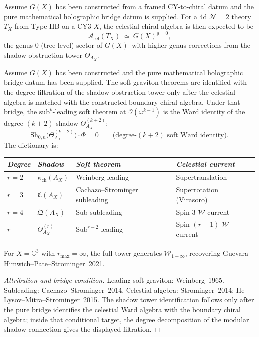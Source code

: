 \begin{conjecture}
\label{conj:phys-cy3-celestial}
\ClaimStatusConjectured
Assume $G(X)$ has been constructed from a framed CY-to-chiral datum and
the pure mathematical holographic bridge datum is supplied. For a 4d
$\mathcal{N}=2$ theory $T_X$ from Type IIB on a CY3 $X$, the celestial
chiral algebra is then expected to be
\[
\mathcal{A}_{\mathrm{cel}}(T_X) \;\simeq\; G(X)^{g=0},
\]
the genus-0 (tree-level) sector of $G(X)$, with higher-genus corrections from the shadow obstruction tower $\Theta_{A_X}$.
\end{conjecture}

\begin{proposition}
\label{prop:phys-cel-soft-shadow}
Assume \(G(X)\) has been constructed and the pure mathematical
holographic bridge datum has been supplied.
The soft graviton theorems are identified with the degree filtration of the shadow obstruction tower only after the celestial algebra is matched with the constructed boundary chiral algebra. Under that bridge, the $\mathrm{sub}^k$-leading soft theorem at $\mathcal{O}(\omega^{k-1})$ is the Ward identity of the degree-$(k+2)$ shadow $\Theta^{(k+2)}_{A_X}$:
\[
\mathrm{Sh}_{0,n}\bigl(\Theta^{(k+2)}_{A_X}\bigr) \cdot \Phi = 0
\qquad \text{(degree-$(k+2)$ soft Ward identity)}.
\]
The dictionary is:
\begin{center}
\renewcommand{\arraystretch}{1.3}
\begin{tabular}{llll}
\hline
\textit{Degree} & \textit{Shadow} & \textit{Soft theorem} & \textit{Celestial current} \\
\hline
$r=2$ & $\kappa_{\mathrm{ch}}(A_X)$ & Weinberg leading & Supertranslation \\
$r=3$ & $\mathfrak{C}(A_X)$ & Cachazo--Strominger subleading & Superrotation (Virasoro) \\
$r=4$ & $\mathfrak{Q}(A_X)$ & Sub-subleading & Spin-3 $\mathcal{W}$-current \\
$r$ & $\Theta^{(r)}_{A_X}$ & $\mathrm{Sub}^{r-2}$-leading & Spin-$(r-1)$ $\mathcal{W}$-current \\
\hline
\end{tabular}
\end{center}
For $X = \mathbb{C}^3$ with $r_{\max} = \infty$, the full tower generates $\mathcal{W}_{1+\infty}$, recovering Guevara--Himwich--Pate--Strominger~2021.
\end{proposition}

\begin{proof}[Attribution and bridge condition]
Leading soft graviton: Weinberg~1965. Subleading: Cachazo--Strominger~2014. Celestial algebra: Strominger~2014; He--Lysov--Mitra--Strominger~2015. The shadow tower identification follows only after the pure bridge identifies the celestial Ward algebra with the boundary chiral algebra; inside that conditional target, the degree decomposition of the modular shadow connection gives the displayed filtration.
\end{proof}

